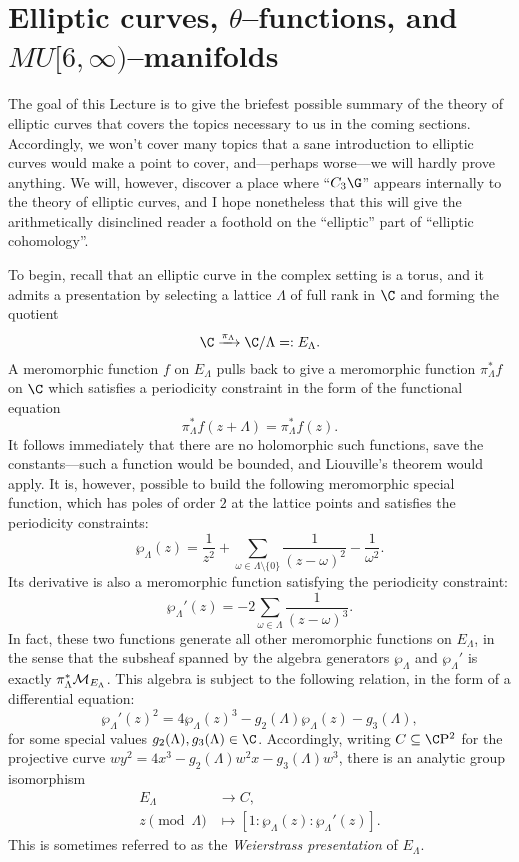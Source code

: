 









\section{Elliptic curves, \texorpdfstring{$\theta$}{theta}--functions, and \texorpdfstring{$MU[6, \infty)$}{MU[6, oo)}--manifolds}\label{SectionEllipticCurvesAndThetaFunctions}

The goal of this Lecture is to give the briefest possible summary of the theory of elliptic curves that covers the topics necessary to us in the coming sections.  Accordingly, we won't cover many topics that a sane introduction to elliptic curves would make a point to cover, and---perhaps worse---we will hardly prove anything.  We will, however, discover a place where ``$C_3 \G$'' appears internally to the theory of elliptic curves, and I hope nonetheless that this will give the arithmetically disinclined reader a foothold on the ``elliptic'' part of ``elliptic cohomology''.

To begin, recall that an elliptic curve in the complex setting is a torus, and it admits a presentation by selecting a lattice $\Lambda$ of full rank in $\C$ and forming the quotient \[\C \xrightarrow{\pi_\Lambda} \C / \Lambda =: E_\Lambda.\]  A meromorphic function $f$ on $E_\Lambda$ pulls back to give a meromorphic function $\pi_\Lambda^* f$ on $\C$ which satisfies a periodicity constraint in the form of the functional equation \[\pi_\Lambda^* f(z + \Lambda) = \pi_\Lambda^* f(z).\]  It follows immediately that there are no holomorphic such functions, save the constants---such a function would be bounded, and Liouville's theorem would apply.  It is, however, possible to build the following meromorphic special function, which has poles of order $2$ at the lattice points and satisfies the periodicity constraints: \[\wp_\Lambda(z) = \frac{1}{z^2} + \sum_{\omega \in \Lambda \setminus \{0\}} \frac{1}{(z - \omega)^2} - \frac{1}{\omega^2}.\]  Its derivative is also a meromorphic function satisfying the periodicity constraint: \[\wp_\Lambda'(z) = -2 \sum_{\omega \in \Lambda} \frac{1}{(z - \omega)^3}.\]  In fact, these two functions generate all other meromorphic functions on $E_\Lambda$, in the sense that the subsheaf spanned by the algebra generators $\wp_\Lambda$ and $\wp_\Lambda'$ is exactly $\pi_\Lambda^* \mathcal{M}_{E_\Lambda}$.  This algebra is subject to the following relation, in the form of a differential equation: \[\wp_\Lambda'(z)^2 = 4 \wp_\Lambda(z)^3 - g_2(\Lambda) \wp_\Lambda(z) - g_3(\Lambda),\] for some special values $g_2(\Lambda), g_3(\Lambda) \in \C$.  Accordingly, writing $C \subseteq \CP^2$ for the projective curve $wy^2 = 4x^3 - g_2(\Lambda) w^2 x - g_3(\Lambda) w^3$, there is an analytic group isomorphism
\begin{align*}
E_\Lambda & \to C, \\
z \pmod \Lambda & \mapsto [1: \wp_\Lambda(z): \wp_\Lambda'(z)].
\end{align*}
This is sometimes referred to as the \textit{Weierstrass presentation} of $E_\Lambda$.

